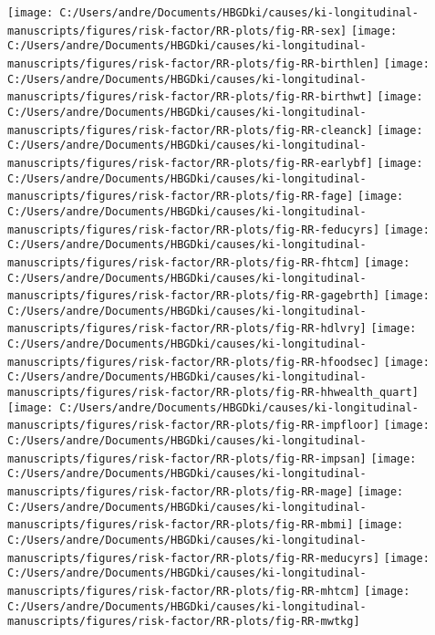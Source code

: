 \documentclass[9pt,]{book}
\begin{document}
\texttt{[image: C:/Users/andre/Documents/HBGDki/causes/ki-longitudinal-manuscripts/figures/risk-factor/RR-plots/fig-RR-sex]}
\texttt{[image: C:/Users/andre/Documents/HBGDki/causes/ki-longitudinal-manuscripts/figures/risk-factor/RR-plots/fig-RR-birthlen]}
\texttt{[image: C:/Users/andre/Documents/HBGDki/causes/ki-longitudinal-manuscripts/figures/risk-factor/RR-plots/fig-RR-birthwt]}
\texttt{[image: C:/Users/andre/Documents/HBGDki/causes/ki-longitudinal-manuscripts/figures/risk-factor/RR-plots/fig-RR-cleanck]}
\texttt{[image: C:/Users/andre/Documents/HBGDki/causes/ki-longitudinal-manuscripts/figures/risk-factor/RR-plots/fig-RR-earlybf]}
\texttt{[image: C:/Users/andre/Documents/HBGDki/causes/ki-longitudinal-manuscripts/figures/risk-factor/RR-plots/fig-RR-fage]}
\texttt{[image: C:/Users/andre/Documents/HBGDki/causes/ki-longitudinal-manuscripts/figures/risk-factor/RR-plots/fig-RR-feducyrs]}
\texttt{[image: C:/Users/andre/Documents/HBGDki/causes/ki-longitudinal-manuscripts/figures/risk-factor/RR-plots/fig-RR-fhtcm]}
\texttt{[image: C:/Users/andre/Documents/HBGDki/causes/ki-longitudinal-manuscripts/figures/risk-factor/RR-plots/fig-RR-gagebrth]}
\texttt{[image: C:/Users/andre/Documents/HBGDki/causes/ki-longitudinal-manuscripts/figures/risk-factor/RR-plots/fig-RR-hdlvry]}
\texttt{[image: C:/Users/andre/Documents/HBGDki/causes/ki-longitudinal-manuscripts/figures/risk-factor/RR-plots/fig-RR-hfoodsec]}
\texttt{[image: C:/Users/andre/Documents/HBGDki/causes/ki-longitudinal-manuscripts/figures/risk-factor/RR-plots/fig-RR-hhwealth\_quart]}
\texttt{[image: C:/Users/andre/Documents/HBGDki/causes/ki-longitudinal-manuscripts/figures/risk-factor/RR-plots/fig-RR-impfloor]}
\texttt{[image: C:/Users/andre/Documents/HBGDki/causes/ki-longitudinal-manuscripts/figures/risk-factor/RR-plots/fig-RR-impsan]}
\texttt{[image: C:/Users/andre/Documents/HBGDki/causes/ki-longitudinal-manuscripts/figures/risk-factor/RR-plots/fig-RR-mage]}
\texttt{[image: C:/Users/andre/Documents/HBGDki/causes/ki-longitudinal-manuscripts/figures/risk-factor/RR-plots/fig-RR-mbmi]}
\texttt{[image: C:/Users/andre/Documents/HBGDki/causes/ki-longitudinal-manuscripts/figures/risk-factor/RR-plots/fig-RR-meducyrs]}
\texttt{[image: C:/Users/andre/Documents/HBGDki/causes/ki-longitudinal-manuscripts/figures/risk-factor/RR-plots/fig-RR-mhtcm]}
\texttt{[image: C:/Users/andre/Documents/HBGDki/causes/ki-longitudinal-manuscripts/figures/risk-factor/RR-plots/fig-RR-mwtkg]}
\end{document}
